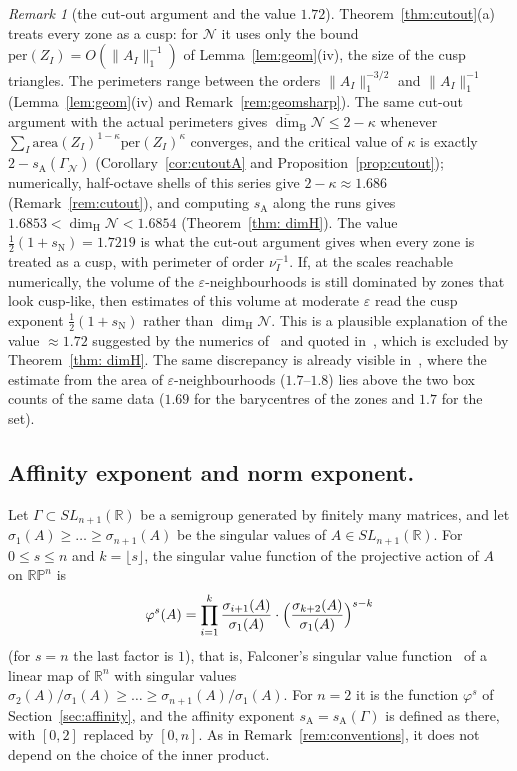 \documentclass[11pt]{amsart}
\theoremstyle{definition}
\theoremstyle{remark}
\newtheorem{remark}[proposition]{Remark}
\newcommand{\R}{\mathbb R}
\newcommand{\RP}{\mathbb{RP}}
\newcommand{\cN}{\mathcal N}
\newcommand{\GN}{\Gamma_{\mathcal N}}
\newcommand{\udimB}{\overline{\dim}_{\mathrm B}}
\newcommand{\sN}{s_{\mathrm N}}
\newcommand{\sA}{s_{\mathrm A}}
\newcommand{\dimH}{\dim_{\mathrm H}}
\begin{document}
\begin{remark}[the cut-out argument and the value $1.72$]\label{rem:172}
Theorem~\ref{thm:cutout}(a) treats every zone as a cusp: for $\cN$ it uses only the bound $\mathrm{per}(Z_I)=O(\|A_I\|_1^{-1})$ of Lemma~\ref{lem:geom}(iv), the size of the cusp triangles. The perimeters range between the orders $\|A_I\|_1^{-3/2}$ and $\|A_I\|_1^{-1}$ (Lemma~\ref{lem:geom}(iv) and Remark~\ref{rem:geomsharp}). The same cut-out argument with the actual perimeters gives $\udimB\cN\le2-\kappa$ whenever $\sum_I\mathrm{area}(Z_I)^{1-\kappa}\mathrm{per}(Z_I)^\kappa$ converges, and the critical value of $\kappa$ is exactly $2-\sA(\GN)$ (Corollary~\ref{cor:cutoutA} and Proposition~\ref{prop:cutout}); numerically, half-octave shells of this series give $2-\kappa\approx1.686$ (Remark~\ref{rem:cutout}), and computing $\sA$ along the runs gives $1.6853<\dimH\cN<1.6854$ (Theorem~\ref{thm: dimH}).
The value $\frac12(1+\sN)=1.7219$ is what the cut-out argument gives when every zone is treated as a cusp, with perimeter of order $\nu_I^{-1}$. If, at the scales reachable numerically, the volume of the $\varepsilon$-neighbourhoods is still dominated by zones that look cusp-like, then estimates of this volume at moderate $\varepsilon$ read the cusp exponent $\frac12(1+\sN)$ rather than $\dimH\cN$. This is a plausible explanation of the value $\approx1.72$ suggested by the numerics of~\cite{DD09} and quoted in~\cite{PS23}, which is excluded by Theorem~\ref{thm: dimH}.
The same discrepancy is already visible in~\cite{DL08}, where the estimate from the area of $\varepsilon$-neighbourhoods ($1.7$--$1.8$) lies above the two box counts of the same data ($1.69$ for the barycentres of the zones and $1.7$ for the set).
\end{remark}

\subsection*{Affinity exponent and norm exponent.}
Let $\Gamma\subset SL_{n+1}(\R)$ be a semigroup generated by finitely many matrices, and let $\sigma_1(A)\ge\dots\ge\sigma_{n+1}(A)$ be the singular values of $A\in SL_{n+1}(\R)$. For $0\le s\le n$ and $k=\lfloor s\rfloor$, the singular value function of the projective action of $A$ on $\RP^n$ is
\[
  \varphi^s(A)=\prod_{i=1}^k\frac{\sigma_{i+1}(A)}{\sigma_1(A)}\cdot
  \Bigl(\frac{\sigma_{k+2}(A)}{\sigma_1(A)}\Bigr)^{s-k}
\]
(for $s=n$ the last factor is $1$), that is, Falconer's singular value function~\cite{Fal88} of a linear map of $\R^n$ with singular values $\sigma_2(A)/\sigma_1(A)\ge\dots\ge\sigma_{n+1}(A)/\sigma_1(A)$. For $n=2$ it is the function $\varphi^s$ of Section~\ref{sec:affinity}, and the affinity exponent $\sA=\sA(\Gamma)$ is defined as there, with $[0,2]$ replaced by $[0,n]$. As in Remark~\ref{rem:conventions}, it does not depend on the choice of the inner product.
\end{document}
